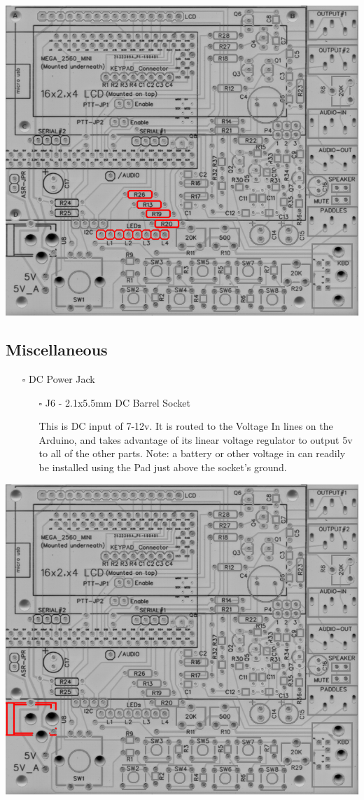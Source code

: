 \documentclass[11pt]{article}
\begin{document}
\begin{center}
\includegraphics[width=.9\linewidth]{../png/3.4/pcb-top-led-indicators.png}
\end{center}

\newpage
\subsection{Miscellaneous}
\label{sec:orgd6581ad}
\begin{itemize}
\item[{$\square$}] DC Power Jack
\begin{itemize}
\item[{$\square$}] J6 - 2.1x5.5mm DC Barrel Socket

This is DC input of 7-12v.  It is routed to the Voltage In lines on the Arduino, and takes advantage of its linear voltage regulator to output 5v to all of the other parts.  Note:  a battery or other voltage in can readily be installed using the Pad just above the socket's ground.
\end{itemize}
\end{itemize}
\begin{center}
\includegraphics[width=.9\linewidth]{../png/3.5/pcb-top-dc-power-jack.png}
\end{center}
\end{document}
